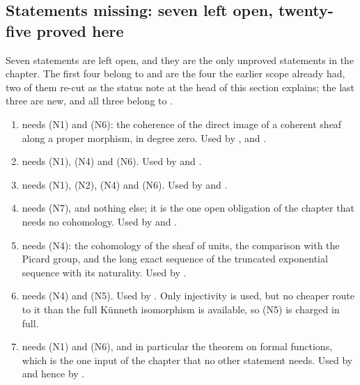 \subsection*{Statements missing: seven left open, twenty-five proved here}

Seven statements are left open, and they are the only unproved statements in
the chapter.  The first four belong to  and are the four
the earlier scope already had, two of them re-cut as the status note at the
head of this section explains; the last three are new, and all three belong to
.
\begin{enumerate}
  \item {} needs (N1) and (N6): the
  coherence of the direct image of a coherent sheaf along a proper morphism,
   in degree zero.  Used by
  ,
   and
  .
  \item {} needs (N1), (N4) and (N6).  Used by
   and .
  \item {} needs (N1), (N2), (N4) and (N6).  Used by
   and .
  \item {} needs (N7), and
  nothing else; it is the one open obligation of the chapter that needs no
  cohomology.  Used by  and
  .
  \item {} needs (N4): the cohomology of the
  sheaf of units, the comparison with the Picard group, and the long exact
  sequence of the truncated exponential sequence with its naturality.  Used by
  .
  \item {} needs (N4) and (N5).  Used by
  .  Only injectivity is used, but no
  cheaper route to it than the full K\"unneth isomorphism is available, so
  (N5) is charged in full.
  \item {} needs (N1) and (N6), and in
  particular the theorem on formal functions, which is the one input of the
  chapter that no other statement needs.  Used by
   and hence by .
\end{enumerate}

